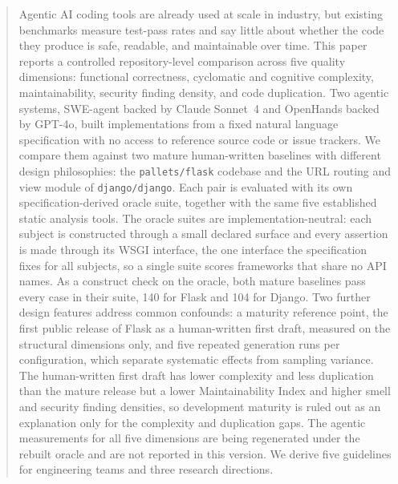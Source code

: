 \begin{abstract}
Agentic AI coding tools are already used at scale in industry, but
existing benchmarks measure test-pass rates and say little about
whether the code they produce is safe, readable, and maintainable over
time. This paper reports a controlled repository-level comparison
across five quality dimensions: functional correctness, cyclomatic and
cognitive complexity, maintainability, security finding density, and
code duplication. Two agentic systems, SWE-agent backed by Claude
Sonnet~4 and OpenHands backed by GPT-4o, built implementations from a
fixed natural language specification with no access to reference
source code or issue trackers. We compare them against two mature
human-written baselines with different design philosophies: the
\texttt{pallets/flask} codebase and the URL routing and view module of
\texttt{django/django}. Each pair is evaluated with its own
specification-derived oracle suite, together with the same five
established static analysis tools. The oracle suites are
implementation-neutral: each subject is constructed through a small
declared surface and every assertion is made through its WSGI
interface, the one interface the specification fixes for all subjects,
so a single suite scores frameworks that share no API names. As a
construct check on the oracle, both mature baselines pass every case
in their suite, 140 for Flask and 104 for Django. Two further design
features address common confounds: a maturity reference point, the
first public release of Flask as a human-written first draft, measured
on the structural dimensions only, and five repeated generation runs
per configuration, which separate systematic effects from sampling
variance. The human-written first draft has lower complexity and less
duplication than the mature release but a lower Maintainability Index
and higher smell and security finding densities, so development
maturity is ruled out as an explanation only for the complexity and
duplication gaps. The agentic measurements for all five dimensions are
being regenerated under the rebuilt oracle and are not reported in
this version. We derive five guidelines for engineering teams and
three research directions.
\end{abstract}
